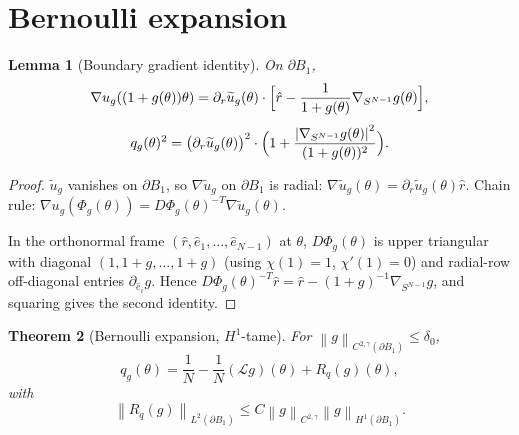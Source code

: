 \documentclass[11pt]{article}
\newtheorem{theorem}{Theorem}
\newtheorem{lemma}[theorem]{Lemma}
\theoremstyle{definition}
\newcommand{\norm}[1]{\left\|#1\right\|}
\newcommand{\abs}[1]{\left|#1\right|}
\begin{document}
\section{Bernoulli expansion}\label{sec:berexp}

\begin{lemma}[Boundary gradient identity]\label{lem:grad}
On $\partial B_1$,
\[
\nabla u_g((1+g(\theta))\theta)
=\partial_r\widetilde u_g(\theta)\cdot\Bigl[\hat r
-\frac{1}{1+g(\theta)}\nabla_{S^{N-1}}g(\theta)\Bigr],
\]
\[
q_g(\theta)^2
=\bigl(\partial_r\widetilde u_g(\theta)\bigr)^2
\cdot\Bigl(1+\frac{\abs{\nabla_{S^{N-1}}g(\theta)}^2}{(1+g(\theta))^2}\Bigr).
\]
\end{lemma}

\begin{proof}
$\widetilde u_g$ vanishes on $\partial B_1$, so $\nabla\widetilde u_g$ on
$\partial B_1$ is radial:
$\nabla\widetilde u_g(\theta)=\partial_r\widetilde u_g(\theta)\hat r$. Chain
rule: $\nabla u_g(\Phi_g(\theta))=D\Phi_g(\theta)^{-T}\nabla\widetilde u_g(\theta)$.

In the orthonormal frame $(\hat r,\hat e_1,\ldots,\hat e_{N-1})$ at $\theta$,
$D\Phi_g(\theta)$ is upper triangular with diagonal $(1,1+g,\ldots,1+g)$
(using $\chi(1)=1$, $\chi'(1)=0$) and radial-row off-diagonal entries
$\partial_{\hat e_i}g$. Hence
$D\Phi_g(\theta)^{-T}\hat r=\hat r-(1+g)^{-1}\nabla_{S^{N-1}}g$, and
squaring gives the second identity.
\end{proof}

\begin{theorem}[Bernoulli expansion, $H^1$-tame]\label{thm:berexp}
For $\norm{g}_{C^{2,\gamma}(\partial B_1)}\le\delta_0$,
\[
q_g(\theta)=\frac{1}{N}-\frac{1}{N}(\mathcal L g)(\theta)+R_q(g)(\theta),
\]
with
\[
\norm{R_q(g)}_{L^2(\partial B_1)}
\le C\norm{g}_{C^{2,\gamma}}\norm{g}_{H^1(\partial B_1)}.
\]
\end{theorem}
\end{document}
